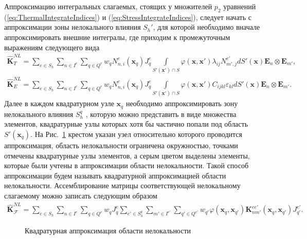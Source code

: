 Аппроксимацию интегральных слагаемых, стоящих у множителей $p_2$ уравнений (\ref{eq:ThermalIntegrateIndices}) и (\ref{eq:StressIntegrateIndices}), следует начать с аппроксимации зоны нелокального влияния $S_h'$, для которой необходимо вначале аппроксимировать внешние интегралы, где приходим к промежуточным выражениям следующего вида
\begin{gather*}
	\widehat{\textbf{K}}^{NL}_T =
	\sum\limits_{e \in S_h}
	\sum\limits_{n \in I^e}
	\sum\limits_{q \in Q^e}
	w_q N_{n,i}^e (\boldsymbol{x}_q) J_q^e
	\int\limits_{S'(\boldsymbol{x}') \cap S}
	\varphi( \boldsymbol{x}, \boldsymbol{x}' )
	\lambda_{ij}
	N_{m', j}^{e'} dS'(\boldsymbol{x})
	\boldsymbol{E}_n \otimes \boldsymbol{E}_{m'}, \\
	\widehat{\textbf{K}}^{NL}_E =
	\sum\limits_{e \in S_h}
	\sum\limits_{n \in I^e}
	\sum\limits_{q \in Q^e}
	w_q N_{n,i}^e (\boldsymbol{x}_q) J_q^e
	\int\limits_{S'(\boldsymbol{x}') \cap S}
	\varphi(\boldsymbol{x}, \boldsymbol{x}') C_{ijkl} \varepsilon_{kl} dS'(\boldsymbol{x})
	\boldsymbol{E}_n \otimes \boldsymbol{E}_{m'}.
\end{gather*}
Далее в каждом квадратурном узле $\boldsymbol{x}_q$ необходимо аппроксимировать зону нелокального влияния $S_h^q$ \cite{Pisano1}, которую можно представить в виде множества элементов, квадратурные узлы которых хотя бы частично попали под область $S'(\boldsymbol{x}_q)$. На Рис.~\ref{fig:ApproxSQ} крестом указан узел относительно которого проводится аппроксимация, область нелокальности ограничена окружностью, точками отмечены квадратурные узлы элементов, а серым цветом выделены элементы, которые были учтены в аппроксимации области нелокальности. Такой способ аппроксимации будем называть квадратурной аппроксимацией области нелокальности. Ассемблирование матрицы соответствующей нелокальному слагаемому можно записать следующим образом
\begin{gather}
	\label{eq:ApproxNonloc}
	\widehat{\textbf{K}}^{NL}_{\mathcal{F}} =
	\sum\limits_{e \in S_h}
	\sum\limits_{n \in I^e}
	\sum\limits_{q \in Q^e}
	w_q J_q^e
	\sum\limits_{e' \in S_h^q}
	\sum\limits_{m' \in I^{e'}}
	\sum\limits_{q' \in Q^{e'}}
	w_{q'} \varphi(\boldsymbol{x}_q, \boldsymbol{x}_{q'}) 
	\textbf{K}_{nm'}^{e e'}(\boldsymbol{x}_q, \boldsymbol{x}_{q'}) J_{q'}^{e'}.
\end{gather}

\begin{figure}[ht]
    \caption{Квадратурная аппроксимация области нелокальности}\label{fig:ApproxSQ}
\end{figure}

